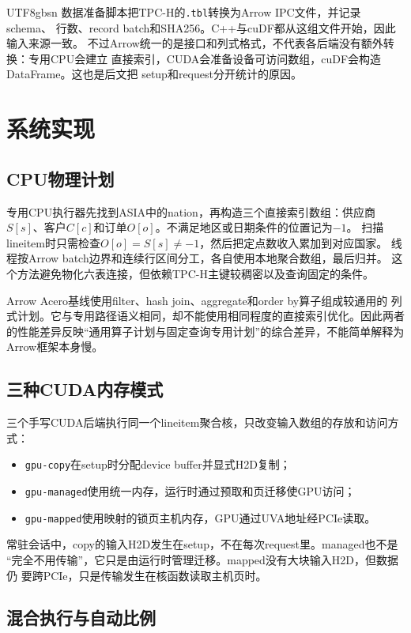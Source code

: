 \documentclass[10.5pt,compsoc]{CjC}
\begin{document}
\begin{CJK*}{UTF8}{gbsn}
数据准备脚本把TPC-H的\texttt{.tbl}转换为Arrow IPC文件，并记录schema、
行数、record batch和SHA256。C++与cuDF都从这组文件开始，因此输入来源一致。
不过Arrow统一的是接口和列式格式，不代表各后端没有额外转换：专用CPU会建立
直接索引，CUDA会准备设备可访问数组，cuDF会构造DataFrame。这也是后文把
setup和request分开统计的原因。

\section{系统实现}

\subsection{CPU物理计划}

专用CPU执行器先找到ASIA中的nation，再构造三个直接索引数组：供应商
$S[s]$、客户$C[c]$和订单$O[o]$。不满足地区或日期条件的位置记为$-1$。
扫描lineitem时只需检查$O[o]=S[s]\neq -1$，然后把定点数收入累加到对应国家。
线程按Arrow batch边界和连续行区间分工，各自使用本地聚合数组，最后归并。
这个方法避免物化六表连接，但依赖TPC-H主键较稠密以及查询固定的条件。

Arrow Acero基线使用filter、hash join、aggregate和order by算子组成较通用的
列式计划。它与专用路径语义相同，却不能使用相同程度的直接索引优化。因此两者
的性能差异反映“通用算子计划与固定查询专用计划”的综合差异，不能简单解释为
Arrow框架本身慢。

\subsection{三种CUDA内存模式}

三个手写CUDA后端执行同一个lineitem聚合核，只改变输入数组的存放和访问方式：
\begin{itemize}
  \item \texttt{gpu-copy}在setup时分配device buffer并显式H2D复制；
  \item \texttt{gpu-managed}使用统一内存，运行时通过预取和页迁移使GPU访问；
  \item \texttt{gpu-mapped}使用映射的锁页主机内存，GPU通过UVA地址经PCIe读取。
\end{itemize}
常驻会话中，copy的输入H2D发生在setup，不在每次request里。managed也不是
“完全不用传输”，它只是由运行时管理迁移。mapped没有大块输入H2D，但数据仍
要跨PCIe，只是传输发生在核函数读取主机页时。

\subsection{混合执行与自动比例}


\end{CJK*}
\end{document}
